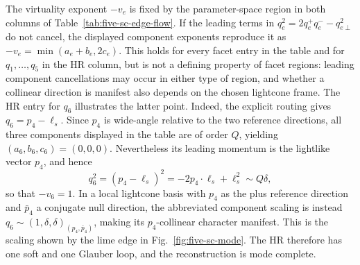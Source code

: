 \documentclass[a4paper,11pt]{article}
\begin{document}
The virtuality exponent \(-v_e\) is fixed by the parameter-space region in
both columns of Table~\ref{tab:five-sc-edge-flow}.  If the leading terms in
\(q_e^2=2q_e^+q_e^- -q_{e\perp}^2\) do not cancel, the displayed component
exponents reproduce it as
\(-v_e=\min(a_e+b_e,2c_e)\).  This holds for every facet entry in the table
and for \(q_1,\ldots,q_5\) in the HR column, but is not a defining property
of facet regions: leading component cancellations may occur in either type
of region, and whether a collinear direction is manifest also depends on the
chosen lightcone frame.  The HR entry for \(q_6\) illustrates the latter
point.  Indeed, the explicit
routing gives \(q_6=p_4-\ell_s\).  Since \(p_4\) is wide-angle relative to
the two reference directions, all three components displayed in the table
are of order \(Q\), yielding \((a_6,b_6,c_6)=(0,0,0)\).  Nevertheless its
leading momentum is the lightlike vector \(p_4\), and hence
\[
 q_6^2=(p_4-\ell_s)^2=-2p_4\mathbin{\cdot}\ell_s+\ell_s^2
 \sim Q\delta,
\]
so that \(-v_6=1\).  In a local lightcone basis with \(p_4\) as the plus
reference direction and \(\bar p_4\) a conjugate null direction, the
abbreviated component scaling is instead
\(q_6\sim(1,\delta,\delta)_{(p_4,\bar p_4)}\), making
its \(p_4\)-collinear character manifest.  This is the scaling shown by the
lime edge in Fig.~\ref{fig:five-sc-mode}.  The HR therefore has one soft and
one Glauber loop, and the reconstruction is mode complete.
\end{document}
